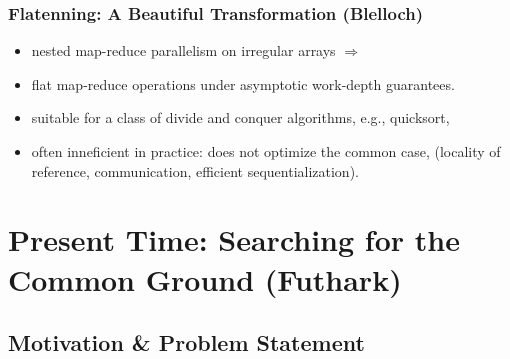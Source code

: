 \documentclass{beamer}
\newcommand{\emp}[1]{\textcolor{DikuRed}{ #1}}
\newcommand{\emphh}[1]{\textcolor{CosGreen}{ #1}}
\begin{document}
\begin{frame}
  \frametitle{Flatenning: A Beautiful Transformation (Blelloch)}

    \begin{itemize}
        \item nested map-reduce parallelism on irregular arrays $\Rightarrow$
        \item flat map-reduce operations under \emphh{asymptotic work-depth guarantees}.\medskip

        \item suitable for a class of \emphh{divide and conquer algorithms}, 
                e.g., quicksort,\medskip

        \item \emp{often inneficient in practice}: does not optimize the common case, 
                (locality of reference, communication, efficient sequentialization).\medskip

    \end{itemize}

\end{frame}


\section{Present Time: Searching for the Common Ground (Futhark)}

\begin{frame}[fragile]
	\tableofcontents[currentsection]
\end{frame}

\subsection{Motivation \& Problem Statement}
\end{document}
